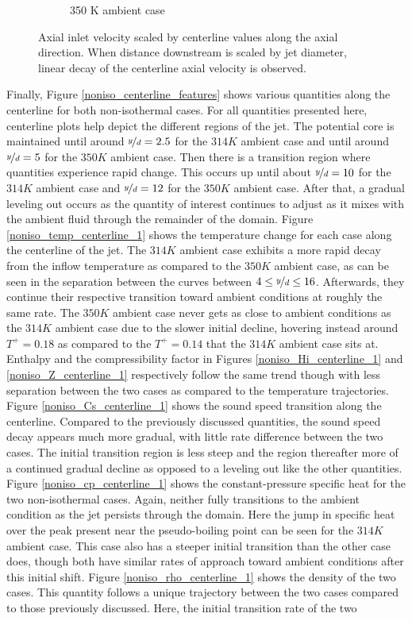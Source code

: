 \begin{figure}[H]
\begin{center}
\begin{subfigure}{0.45\textwidth}
	\caption{350 K ambient case} \label{noniso_uin_u0_x_d_2}
\end{subfigure}
\caption{Axial inlet velocity scaled by centerline values along the axial direction. When distance downstream is scaled by jet diameter, linear decay of the centerline axial velocity is observed.}
\label{noniso_uin_u0_x_d_features}
\end{center}
\end{figure}
Finally, Figure \ref{noniso_centerline_features} shows various quantities along the centerline for both non-isothermal cases. For all quantities presented here, centerline plots help depict the different regions of the jet. The potential core is maintained until around $\nicefrac{y}{d} = 2.5$ for the $314 K$ ambient case and until around $\nicefrac{y}{d}= 5$ for the $350 K$ ambient case. Then there is a transition region where quantities experience rapid change. This occurs up until about $\nicefrac{y}{d}= 10$ for the $314 K$ ambient case and $\nicefrac{y}{d} = 12$ for the $350 K$ ambient case. After that, a gradual leveling out occurs as the quantity of interest continues to adjust as it mixes with the ambient fluid through the remainder of the domain. Figure \ref{noniso_temp_centerline_1} shows the temperature change for each case along the centerline of the jet. The $314 K$ ambient case exhibits a more rapid decay from the inflow temperature as compared to the $350 K$ ambient case, as can be seen in the separation between the curves between $4 \leq \nicefrac{y}{d} \leq 16$. Afterwards, they continue their respective transition toward ambient conditions at roughly the same rate. The $350 K$ ambient case never gets as close to ambient conditions as the $314 K$ ambient case due to the slower initial decline, hovering instead around $T^+=0.18$ as compared to the $T^+=0.14$ that the $314 K$ ambient case sits at. Enthalpy and the compressibility factor in Figures \ref{noniso_Hi_centerline_1} and \ref{noniso_Z_centerline_1} respectively follow the same trend though with less separation between the two cases as compared to the temperature trajectories. Figure \ref{noniso_Cs_centerline_1} shows the sound speed transition along the centerline. Compared to the previously discussed quantities, the sound speed decay appears much more gradual, with little rate difference between the two cases. The initial transition region is less steep and the region thereafter more of a continued gradual decline as opposed to a leveling out like the other quantities. Figure \ref{noniso_cp_centerline_1} shows the constant-pressure specific heat for the two non-isothermal cases. Again, neither fully transitions to the ambient condition as the jet persists through the domain. Here the jump in specific heat over the peak present near the pseudo-boiling point can be seen for the $314 K$ ambient case. This case also has a steeper initial transition than the other case does, though both have similar rates of approach toward ambient conditions after this initial shift. Figure \ref{noniso_rho_centerline_1} shows the density of the two cases. This quantity follows a unique trajectory between the two cases compared to those previously discussed. Here, the initial transition rate of the two 